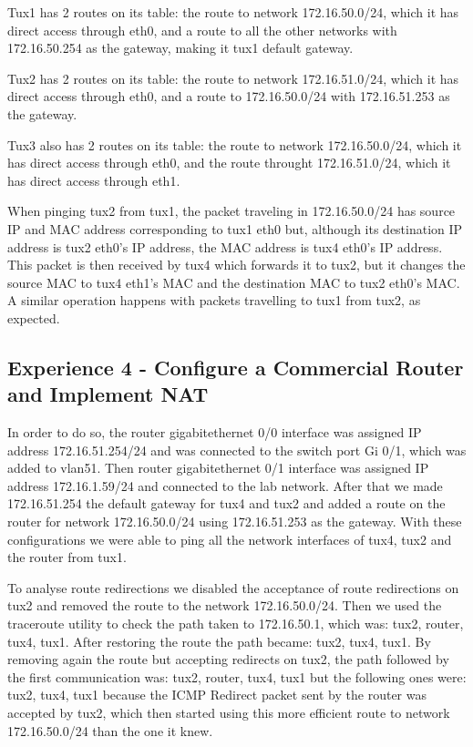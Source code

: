 \documentclass[11pt,a4paper,reqno]{article}
\numberwithin{equation}{section}
\begin{document}
Tux1 has 2 routes on its table: the route to network 172.16.50.0/24, which it has direct access through eth0, and a route to all the other networks with 172.16.50.254 as the gateway, making it tux1 default gateway.

Tux2 has 2 routes on its table: the route to network 172.16.51.0/24, which it has direct access through eth0, and a route to 172.16.50.0/24 with 172.16.51.253 as the gateway.

Tux3 also has 2 routes on its table: the route to network 172.16.50.0/24, which it has direct access through eth0, and the route throught 172.16.51.0/24, which it has direct access through eth1.

When pinging tux2 from tux1, the packet traveling in 172.16.50.0/24 has source IP and MAC address corresponding to tux1 eth0 but, although its destination IP address is tux2 eth0’s IP address, the MAC address is tux4 eth0’s IP address. This packet is then received by tux4 which forwards it to tux2, but it changes the source MAC to tux4 eth1’s MAC and the destination MAC to tux2 eth0’s MAC. A similar operation happens with packets travelling to tux1 from tux2, as expected.

\subsection{Experience 4 - Configure a Commercial Router and Implement NAT}

In order to do so, the router gigabitethernet 0/0 interface was assigned IP address 172.16.51.254/24 and was connected to the switch port Gi 0/1, which was added to vlan51. Then router gigabitethernet 0/1 interface was assigned IP address 172.16.1.59/24 and connected to the lab network. After that we made 172.16.51.254 the default gateway for tux4 and tux2 and added a route on the router for network 172.16.50.0/24 using 172.16.51.253 as the gateway. With these configurations we were able to ping all the network interfaces of tux4, tux2 and the router from tux1.

To analyse route redirections we disabled the acceptance of route redirections on tux2 and removed the route to the network 172.16.50.0/24. Then we used the traceroute utility to check the path taken to 172.16.50.1, which was: tux2, router, tux4, tux1. After restoring the route the path became: tux2, tux4, tux1. By removing again the route but accepting redirects on tux2, the path followed by the first communication was: tux2, router, tux4, tux1 but the following ones were: tux2, tux4, tux1 because the ICMP Redirect packet sent by the router was accepted by tux2, which then started using this more efficient route to network 172.16.50.0/24 than the one it knew.
\end{document}
